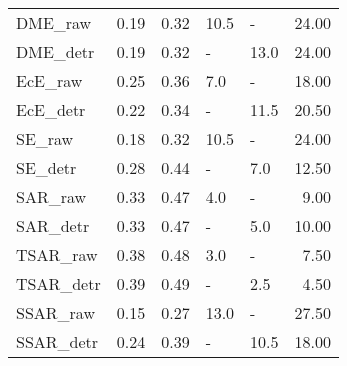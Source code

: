 \begin{tabular}{lllllr}
DME\_raw & 0.19 & 0.32 & 10.5 & - & 24.00 \\
DME\_detr & 0.19 & 0.32 & - & 13.0 & 24.00 \\
\midrule
EcE\_raw & 0.25 & 0.36 & 7.0 & - & 18.00 \\
EcE\_detr & 0.22 & 0.34 & - & 11.5 & 20.50 \\
\midrule
SE\_raw & 0.18 & 0.32 & 10.5 & - & 24.00 \\
SE\_detr & 0.28 & 0.44 & - & 7.0 & 12.50 \\
\midrule
SAR\_raw & 0.33 & 0.47 & 4.0 & - & 9.00 \\
SAR\_detr & 0.33 & 0.47 & - & 5.0 & 10.00 \\
\midrule
TSAR\_raw & 0.38 & 0.48 & 3.0 & - & 7.50 \\
TSAR\_detr & 0.39 & 0.49 & - & 2.5 & 4.50 \\
\midrule
SSAR\_raw & 0.15 & 0.27 & 13.0 & - & 27.50 \\
SSAR\_detr & 0.24 & 0.39 & - & 10.5 & 18.00 \\
\midrule
\bottomrule
\end{tabular}
\midrule
